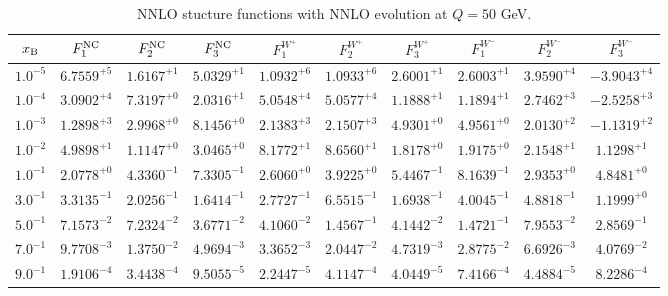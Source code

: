 \begin{table}[h]
\begin{adjustbox}{width=\textwidth}
\begin{tabular}{|c||c|c|c|c|c|c|c|c|c|}
\hline
$x_{\rm B}$ & $F_1^{\rm NC}$ & $F_2^{\rm NC}$ & $F_3^{\rm NC}$ & $F_1^{W^+}$ & $F_2^{W^+}$ & $F_3^{W^+}$ & $F_1^{W^-}$ & $F_2^{W^-}$ & $F_3^{W^-}$ \\
\hline
$ 1.0^{-5}$ & $ 6.7559^{+5}$ & $ 1.6167^{+1}$ & $ 5.0329^{+1}$ & $ 1.0932^{+6}$ & $ 1.0933^{+6}$ & $ 2.6001^{+1}$ & $ 2.6003^{+1}$ & $ 3.9590^{+4}$ & $-3.9043^{+4}$ \\
$ 1.0^{-4}$ & $ 3.0902^{+4}$ & $ 7.3197^{+0}$ & $ 2.0316^{+1}$ & $ 5.0548^{+4}$ & $ 5.0577^{+4}$ & $ 1.1888^{+1}$ & $ 1.1894^{+1}$ & $ 2.7462^{+3}$ & $-2.5258^{+3}$ \\
$ 1.0^{-3}$ & $ 1.2898^{+3}$ & $ 2.9968^{+0}$ & $ 8.1456^{+0}$ & $ 2.1383^{+3}$ & $ 2.1507^{+3}$ & $ 4.9301^{+0}$ & $ 4.9561^{+0}$ & $ 2.0130^{+2}$ & $-1.1319^{+2}$ \\
$ 1.0^{-2}$ & $ 4.9898^{+1}$ & $ 1.1147^{+0}$ & $ 3.0465^{+0}$ & $ 8.1772^{+1}$ & $ 8.6560^{+1}$ & $ 1.8178^{+0}$ & $ 1.9175^{+0}$ & $ 2.1548^{+1}$ & $ 1.1298^{+1}$ \\
$ 1.0^{-1}$ & $ 2.0778^{+0}$ & $ 4.3360^{-1}$ & $ 7.3305^{-1}$ & $ 2.6060^{+0}$ & $ 3.9225^{+0}$ & $ 5.4467^{-1}$ & $ 8.1639^{-1}$ & $ 2.9353^{+0}$ & $ 4.8481^{+0}$ \\
$ 3.0^{-1}$ & $ 3.3135^{-1}$ & $ 2.0256^{-1}$ & $ 1.6414^{-1}$ & $ 2.7727^{-1}$ & $ 6.5515^{-1}$ & $ 1.6938^{-1}$ & $ 4.0045^{-1}$ & $ 4.8818^{-1}$ & $ 1.1999^{+0}$ \\
$ 5.0^{-1}$ & $ 7.1573^{-2}$ & $ 7.2324^{-2}$ & $ 3.6771^{-2}$ & $ 4.1060^{-2}$ & $ 1.4567^{-1}$ & $ 4.1442^{-2}$ & $ 1.4721^{-1}$ & $ 7.9553^{-2}$ & $ 2.8569^{-1}$ \\
$ 7.0^{-1}$ & $ 9.7708^{-3}$ & $ 1.3750^{-2}$ & $ 4.9694^{-3}$ & $ 3.3652^{-3}$ & $ 2.0447^{-2}$ & $ 4.7319^{-3}$ & $ 2.8775^{-2}$ & $ 6.6926^{-3}$ & $ 4.0769^{-2}$ \\
$ 9.0^{-1}$ & $ 1.9106^{-4}$ & $ 3.4438^{-4}$ & $ 9.5055^{-5}$ & $ 2.2447^{-5}$ & $ 4.1147^{-4}$ & $ 4.0449^{-5}$ & $ 7.4166^{-4}$ & $ 4.4884^{-5}$ & $ 8.2286^{-4}$ \\
\hline
\end{tabular}
\end{adjustbox}\caption{NNLO stucture functions with NNLO evolution at $Q = 50$ GeV.}
\label{tab:N2LO-Q50}
\end{table}


